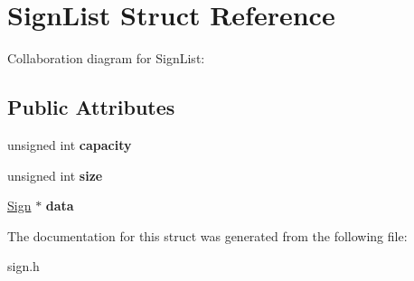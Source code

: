 \hypertarget{structSignList}{}\section{Sign\+List Struct Reference}
\label{structSignList}


Collaboration diagram for Sign\+List\+:
\subsection*{Public Attributes}
\begin{DoxyCompactItemize}
\item 
\mbox{\label{structSignList_a56d04de93571aa77cff50c4ee30f8682}} 
unsigned int {\bfseries capacity}
\item 
\mbox{\label{structSignList_a1a62d68f9161254e618060ab4ffe2d89}} 
unsigned int {\bfseries size}
\item 
\mbox{\label{structSignList_aee3357bed55f987188d91160a631ae64}} 
\hyperlink{structSign}{Sign} $\ast$ {\bfseries data}
\end{DoxyCompactItemize}


The documentation for this struct was generated from the following file\+:\begin{DoxyCompactItemize}
\item 
sign.\+h\end{DoxyCompactItemize}
